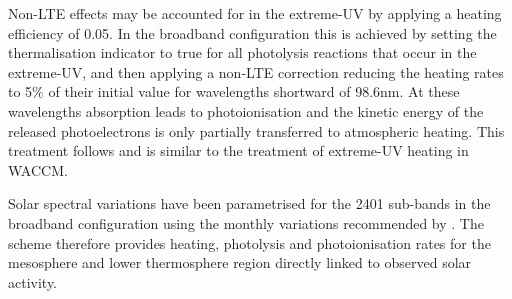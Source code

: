 Non-LTE effects may be accounted for in the extreme-UV by applying a heating efficiency of 0.05. In the broadband configuration this is achieved by setting the thermalisation indicator to true for all photolysis reactions that occur in the extreme-UV, and then applying a non-LTE correction reducing the heating rates to 5\% of their initial value for wavelengths shortward of 98.6nm. At these wavelengths absorption leads to photoionisation and the kinetic energy of the released photoelectrons is only partially transferred to atmospheric heating. This treatment follows \cite{Roble87} and is similar to the treatment of extreme-UV heating in WACCM. 

Solar spectral variations have been parametrised for the 2401 sub-bands in the broadband configuration using the monthly variations recommended by \cite{Matthes17}. The scheme therefore provides heating, photolysis and photoionisation rates for the mesosphere and lower thermosphere region directly linked to observed solar activity.
